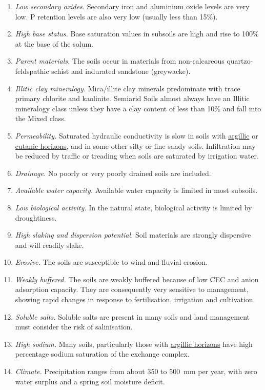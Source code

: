 \documentclass[
  letterpaper,
  DIV=11,
  numbers=noendperiod]{scrreprt}
\providecommand{\tightlist}{%
  \setlength{\itemsep}{0pt}\setlength{\parskip}{0pt}}\usepackage{longtable,booktabs,array}
\begin{document}
\begin{enumerate}
\def\labelenumi{\arabic{enumi}.}
\tightlist
\item
  \emph{Low secondary oxides.} Secondary iron and aluminium oxide levels
  are very low. P retention levels are also very low (usually less than
  15\%).
\item
  \emph{High base status.} Base saturation values in subsoils are high
  and rise to 100\% at the base of the solum.
\item
  \emph{Parent materials.} The soils occur in materials from
  non-calcareous quartzo-feldspathic schist and indurated sandstone
  (greywacke).
\item
  \emph{Illitic clay mineralogy.} Mica/illite clay minerals predominate
  with trace primary chlorite and kaolinite. Semiarid Soils almost
  always have an Illitic mineralogy class unless they have a clay
  content of less than 10\% and fall into the Mixed class.
\item
  \emph{Permeability.} Saturated hydraulic conductivity is slow in soils
  with \protect\hyperlink{sec-diag-argh}{argillic} or
  \protect\hyperlink{sec-diag-cuth}{cutanic horizons}, and in some other
  silty or fine sandy soils. Infiltration may be reduced by traffic or
  treading when soils are saturated by irrigation water.
\item
  \emph{Drainage.} No poorly or very poorly drained soils are included.
\item
  \emph{Available water capacity.} Available water capacity is limited
  in most subsoils.
\item
  \emph{Low biological activity.} In the natural state, biological
  activity is limited by droughtiness.
\item
  \emph{High slaking and dispersion potential.} Soil materials are
  strongly dispersive and will readily slake.
\item
  \emph{Erosive.} The soils are susceptible to wind and fluvial erosion.
\item
  \emph{Weakly buffered.} The soils are weakly buffered because of low
  CEC and anion adsorption capacity. They are consequently very
  sensitive to management, showing rapid changes in response to
  fertilisation, irrigation and cultivation.
\item
  \emph{Soluble salts.} Soluble salts are present in many soils and land
  management must consider the risk of salinisation.
\item
  \emph{High sodium.} Many soils, particularly those with
  \protect\hyperlink{sec-diag-argh}{argillic horizons} have high
  percentage sodium saturation of the exchange complex.
\item
  \emph{Climate.} Precipitation ranges from about 350 to 500~mm per
  year, with zero water surplus and a spring soil moisture deficit.
\end{enumerate}
\end{document}
